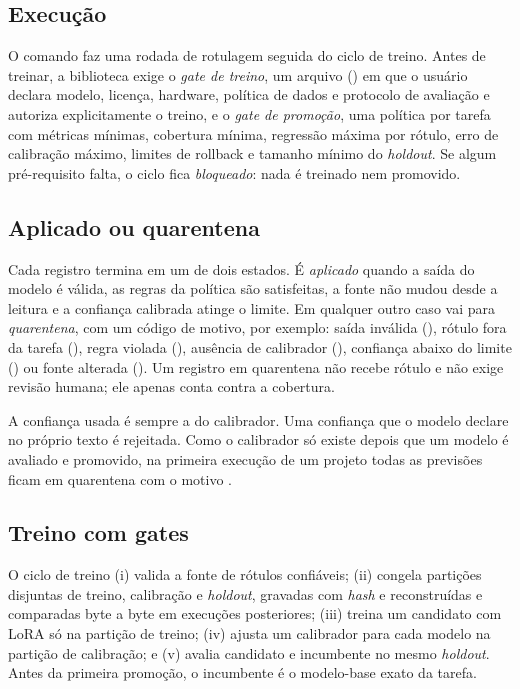 \subsection{Execução}

O comando  faz uma rodada de rotulagem seguida do ciclo de treino. Antes de treinar, a biblioteca exige o \emph{gate de treino}, um arquivo () em que o usuário declara modelo, licença, hardware, política de dados e protocolo de avaliação e autoriza explicitamente o treino, e o \emph{gate de promoção}, uma política por tarefa com métricas mínimas, cobertura mínima, regressão máxima por rótulo, erro de calibração máximo, limites de rollback e tamanho mínimo do \emph{holdout}. Se algum pré-requisito falta, o ciclo fica \emph{bloqueado}: nada é treinado nem promovido.

\subsection{Aplicado ou quarentena}

Cada registro termina em um de dois estados. É \emph{aplicado} quando a saída do modelo é válida, as regras da política são satisfeitas, a fonte não mudou desde a leitura e a confiança calibrada atinge o limite. Em qualquer outro caso vai para \emph{quarentena}, com um código de motivo, por exemplo: saída inválida (), rótulo fora da tarefa (), regra violada (), ausência de calibrador (), confiança abaixo do limite () ou fonte alterada (). Um registro em quarentena não recebe rótulo e não exige revisão humana; ele apenas conta contra a cobertura.

A confiança usada é sempre a do calibrador. Uma confiança que o modelo declare no próprio texto é rejeitada. Como o calibrador só existe depois que um modelo é avaliado e promovido, na primeira execução de um projeto todas as previsões ficam em quarentena com o motivo .

\subsection{Treino com gates}

O ciclo de treino (i) valida a fonte de rótulos confiáveis; (ii) congela partições disjuntas de treino, calibração e \emph{holdout}, gravadas com \emph{hash} e reconstruídas e comparadas byte a byte em execuções posteriores; (iii) treina um candidato com LoRA só na partição de treino; (iv) ajusta um calibrador para cada modelo na partição de calibração; e (v) avalia candidato e incumbente no mesmo \emph{holdout}. Antes da primeira promoção, o incumbente é o modelo-base exato da tarefa.

